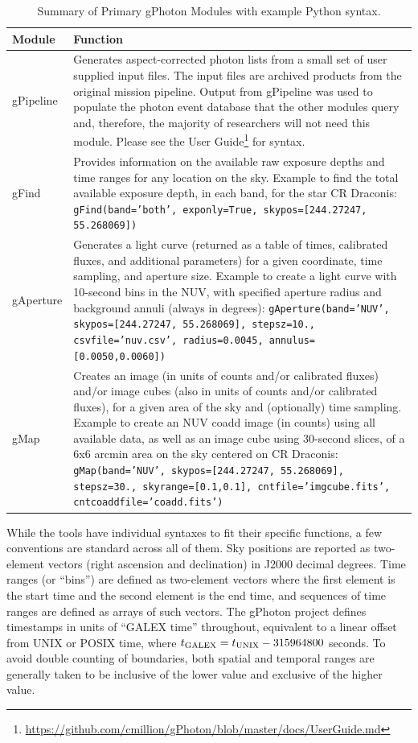 \documentclass[iop]{emulateapj}
\begin{document}
\begin{table}[h]
\begin{tabular}{|L{1.5cm}|L{6.5cm}|}
\hline
	{\bf Module} & {\bf Function}\\\hline
	gPipeline & Generates aspect-corrected photon lists from a small set of user supplied input files. The input files are archived products from the original mission pipeline. Output from gPipeline was used to populate the photon event database that the other modules query and, therefore, the majority of researchers will not need this module. Please see the User Guide\footnote{\url{https://github.com/cmillion/gPhoton/blob/master/docs/UserGuide.md}} for syntax.\\\hline
	gFind & Provides information on the available raw exposure depths and time ranges for any location on the sky. Example to find the total available exposure depth, in each band, for the star CR Draconis: \parbox[t]{6.5cm}{\texttt{gFind(band='both', exponly=True, skypos=[244.27247, 55.268069])}}\\\hline
	gAperture & Generates a light curve (returned as a table of times, calibrated fluxes, and additional parameters) for a given coordinate, time sampling, and aperture size. Example to create a light curve with 10-second bins in the NUV, with specified aperture radius and background annuli (always in degrees): \parbox[t]{6.5cm}{\texttt{gAperture(band='NUV', skypos=[244.27247, 55.268069], stepsz=10., csvfile='nuv.csv', radius=0.0045, annulus=[0.0050,0.0060])}}\\\hline
	gMap & Creates an image (in units of counts and/or calibrated fluxes) and/or image cubes (also in units of counts and/or calibrated fluxes), for a given area of the sky and (optionally) time sampling. Example to create an NUV coadd image (in counts) using all available data, as well as an image cube using 30-second slices, of a 6x6 arcmin area on the sky centered on CR Draconis: \parbox[t]{6.5cm}{\texttt{gMap(band='NUV', skypos=[244.27247, 55.268069], stepsz=30., skyrange=[0.1,0.1], cntfile='imgcube.fits', cntcoaddfile='coadd.fits')}}\\\hline
\end{tabular}
\caption{Summary of Primary gPhoton Modules with example Python syntax.}
\label{moduledesc}
\end{table}

While the tools have individual syntaxes to fit their specific functions, a few conventions are standard across all of them. Sky positions are reported as two-element vectors (right ascension and declination) in J2000 decimal degrees. Time ranges (or ``bins'') are defined as two-element vectors where the first element is the start time and the second element is the end time, and sequences of time ranges are defined as arrays of such vectors. The gPhoton project defines timestamps in units of ``GALEX time'' throughout, equivalent to a linear offset from UNIX or POSIX time, where $t_{\rm{GALEX}} = t_{\rm{UNIX}} - 315964800$ seconds. To avoid double counting of boundaries, both spatial and temporal ranges are generally taken to be inclusive of the lower value and exclusive of the higher value.
\end{document}
